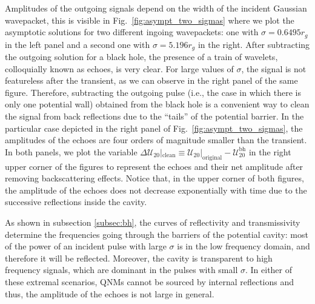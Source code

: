 \documentclass[article,aps,nofootinbib,twocolumn,superscriptaddress]{revtex4-1}
\begin{document}
Amplitudes of the outgoing signals depend on the width of the incident Gaussian wavepacket, this is visible in Fig.~\ref{fig:asympt_two_sigmas} where we plot the asymptotic solutions for two different ingoing wavepackets: one with $\sigma=0.6495r_g$ in the left panel and a second one with $\sigma=5.196r_g$ in the right. After subtracting the outgoing solution for a black hole, the presence of a train of wavelets, colloquially known as echoes, is very clear. For large values of $\sigma$, the signal is not featureless after the transient, as we can observe in the right panel of the same figure. Therefore, subtracting the outgoing pulse (i.e., the case in which there is only one potential wall) obtained from the black hole is a convenient way to clean the signal from back reflections due to the ``tails'' of the potential barrier. In the particular case depicted in the right panel of Fig.~\ref{fig:asympt_two_sigmas}, the amplitudes of the echoes are four orders of magnitude smaller than the transient. In both panels, we plot the variable $\Delta\mathcal{U}_{20}|_{\mathrm{clean}}\equiv\mathcal{U}_{20}|_{\mathrm{original}}-\mathcal{U}^{\mathrm{bh}}_{20}$ in the right upper corner of the figures to represent the echoes and their net amplitude after removing backscattering effects. Notice that, in the upper corner of both figures, the amplitude of the echoes does not decrease exponentially with time due to the successive reflections inside the cavity.
 
As shown in subsection \ref{subsec:bh}, the curves of reflectivity and transmissivity determine the frequencies going through the barriers of the potential cavity: most of the power of an incident pulse with large $\sigma$ is in the low frequency domain, and therefore it will be reflected. Moreover, the cavity is transparent to high frequency signals, which are dominant in the pulses with small $\sigma$. In either of these extremal scenarios, QNMs cannot be sourced by internal reflections and thus, the amplitude of the echoes is not large in general.\\
 
\end{document}
